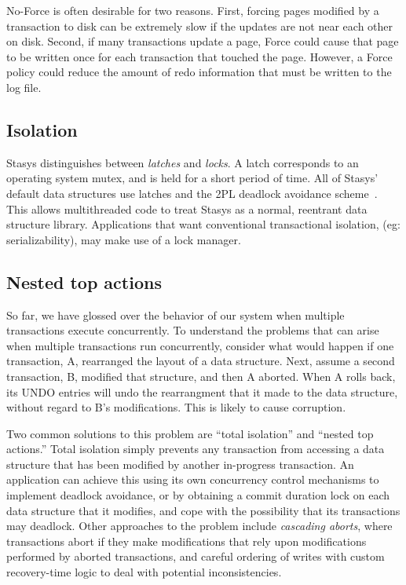 \documentclass[letterpaper,twocolumn,10pt]{article}
\newcommand{\yad}{Stasys\xspace}
\newcommand{\yads}{Stasys'\xspace}
\begin{document}
No-Force is often desirable for two reasons.  First, forcing pages
modified by a transaction to disk can be extremely slow if the updates
are not near each other on disk.  Second, if many transactions update
a page, Force could cause that page to be written once for each transaction
that touched the page.  However, a Force policy could reduce the
amount of redo information that must be written to the log file.

\subsection{Isolation}

\yad distinguishes between {\em latches} and {\em locks}.  A latch
corresponds to an operating system mutex, and is held for a short
period of time.  All of \yads default data structures use latches and
the 2PL deadlock avoidance scheme~\cite{twoPhaseLocking}.  This allows multithreaded code to treat
\yad as a normal, reentrant data structure library.  Applications that
want conventional transactional isolation, (eg: serializability), may
make use of a lock manager.

\subsection{Nested top actions}

So far, we have glossed over the behavior of our system when multiple
transactions execute concurrently.  To understand the problems that
can arise when multiple transactions run concurrently, consider what
would happen if one transaction, A, rearranged the layout of a data
structure.  Next, assume a second transaction, B, modified that
structure, and then A aborted.  When A rolls back, its UNDO entries
will undo the rearrangment that it made to the data structure, without
regard to B's modifications.  This is likely to cause corruption.

Two common solutions to this problem are ``total isolation'' and
``nested top actions.''  Total isolation simply prevents any
transaction from accessing a data structure that has been modified by
another in-progress transaction.  An application can achieve this
using its own concurrency control mechanisms to implement deadlock
avoidance, or by obtaining a commit duration lock on each data
structure that it modifies, and cope with the possibility that its
transactions may deadlock.  Other approaches to the problem include
{\em cascading aborts}, where transactions abort if they make
modifications that rely upon modifications performed by aborted
transactions, and careful ordering of writes with custom recovery-time
logic to deal with potential inconsistencies.  
\end{document}
